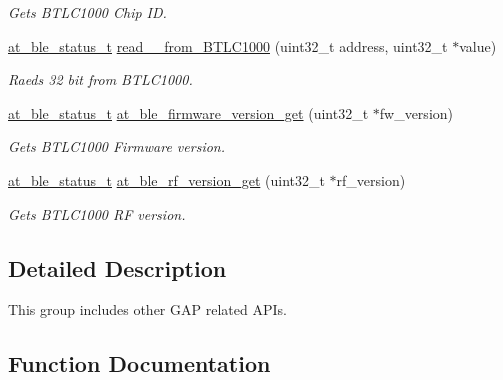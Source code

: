 \begin{DoxyCompactItemize}
\begin{DoxyCompactList}\small\item\em Gets B\+T\+L\+C1000 Chip ID. \end{DoxyCompactList}\item 
\mbox{\hyperlink{group__error__codes__group_ga3b1db9b95feb157b3c188ca27fe76988}{at\+\_\+ble\+\_\+status\+\_\+t}} \mbox{\hyperlink{group__gap__misc__group_gafbcae7ff40f05d01e17b41430ae2987f}{read\+\_\+\_\+from\+\_\+\+B\+T\+L\+C1000}} (uint32\+\_\+t address, uint32\+\_\+t $\ast$value)
\begin{DoxyCompactList}\small\item\em Raeds 32 bit from B\+T\+L\+C1000. \end{DoxyCompactList}\item 
\mbox{\hyperlink{group__error__codes__group_ga3b1db9b95feb157b3c188ca27fe76988}{at\+\_\+ble\+\_\+status\+\_\+t}} \mbox{\hyperlink{group__gap__misc__group_ga2ad880a04d258b285c8a53a0d6008abb}{at\+\_\+ble\+\_\+firmware\+\_\+version\+\_\+get}} (uint32\+\_\+t $\ast$fw\+\_\+version)
\begin{DoxyCompactList}\small\item\em Gets B\+T\+L\+C1000 Firmware version. \end{DoxyCompactList}\item 
\mbox{\hyperlink{group__error__codes__group_ga3b1db9b95feb157b3c188ca27fe76988}{at\+\_\+ble\+\_\+status\+\_\+t}} \mbox{\hyperlink{group__gap__misc__group_gae548b85d5a03b4e15990da3f829f6220}{at\+\_\+ble\+\_\+rf\+\_\+version\+\_\+get}} (uint32\+\_\+t $\ast$rf\+\_\+version)
\begin{DoxyCompactList}\small\item\em Gets B\+T\+L\+C1000 RF version. \end{DoxyCompactList}\end{DoxyCompactItemize}


\subsection{Detailed Description}
This group includes other G\+AP related A\+P\+Is. 



\subsection{Function Documentation}
\mbox{\label{group__gap__misc__group_ga88911a96609744ebd24b3b00edfb2a06}} 
